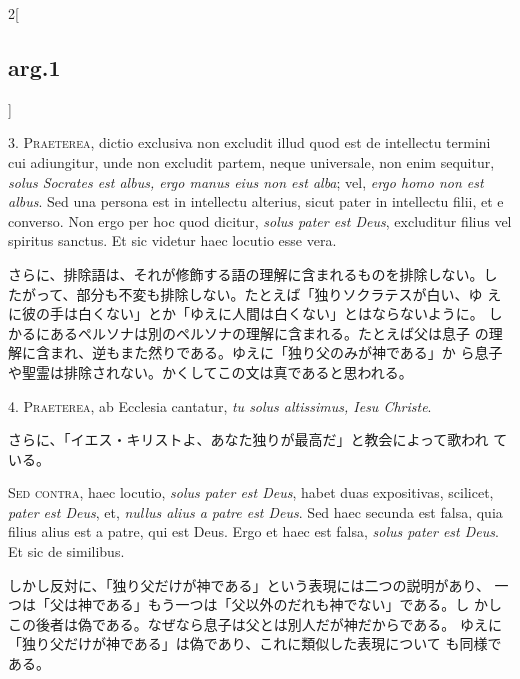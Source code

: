 \documentclass[paper=a4paper,fontsize=10pt,jafontsize=9pt,titlepage]{jlreq}
\begin{document}
\begin{paracol}{2}[\subsection{arg.1}]

3. {\scshape Praeterea}, dictio exclusiva non excludit illud quod est de intellectu
termini cui adiungitur, unde non excludit partem, neque universale,
non enim sequitur, {\itshape solus Socrates est albus, ergo manus eius non est
alba}; vel, {\itshape ergo homo non est albus}. Sed una persona est in intellectu
alterius, sicut pater in intellectu filii, et e converso. Non ergo per
hoc quod dicitur, {\itshape solus pater est Deus}, excluditur filius vel spiritus
sanctus. Et sic videtur haec locutio esse vera.

\switchcolumn

さらに、排除語は、それが修飾する語の理解に含まれるものを排除しない。し
 たがって、部分も不変も排除しない。たとえば「独りソクラテスが白い、ゆ
 えに彼の手は白くない」とか「ゆえに人間は白くない」とはならないように。
 しかるにあるペルソナは別のペルソナの理解に含まれる。たとえば父は息子
 の理解に含まれ、逆もまた然りである。ゆえに「独り父のみが神である」か
 ら息子や聖霊は排除されない。かくしてこの文は真であると思われる。


4. {\scshape Praeterea}, ab Ecclesia cantatur, {\itshape tu solus altissimus, Iesu Christe}.

\switchcolumn

さらに、「イエス・キリストよ、あなた独りが最高だ」と教会によって歌われ
 ている。

\switchcolumn*[\subsection{s.c.}]

{\scshape Sed contra}, haec locutio, {\itshape solus pater est Deus}, habet duas
expositivas, scilicet, {\itshape pater est Deus}, et, {\itshape nullus alius a patre est
Deus}. Sed haec secunda est falsa, quia filius alius est a patre, qui
est Deus. Ergo et haec est falsa, {\itshape solus pater est Deus}. Et sic de
similibus.

\switchcolumn

しかし反対に、「独り父だけが神である」という表現には二つの説明があり、
 一つは「父は神である」もう一つは「父以外のだれも神でない」である。し
 かしこの後者は偽である。なぜなら息子は父とは別人だが神だからである。
 ゆえに「独り父だけが神である」は偽であり、これに類似した表現について
 も同様である。


\end{paracol}
\end{document}
